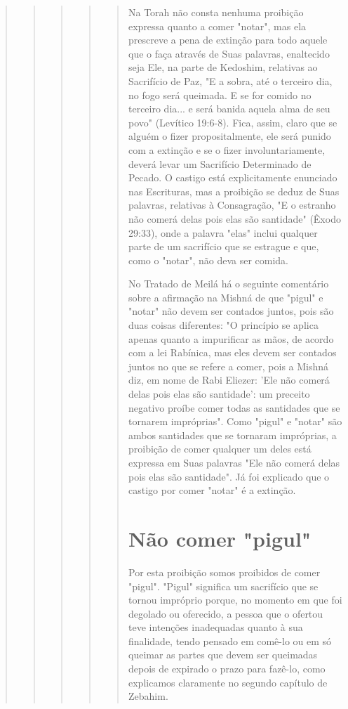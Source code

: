 \begin{quote}
\begin{quote}
\begin{quote}
\begin{quote}
\begin{quote}
Na Torah não consta nenhuma proibição expressa quanto a comer "notar",
mas ela prescreve a pena de extinção para todo aquele que o faça
atra­vés de Suas palavras, enaltecido seja Ele, na parte de Kedoshim,
relativas ao Sacrifício de Paz, "E a sobra, até o terceiro dia, no fogo
será queimada. E se for comido no terceiro dia... e será banida aquela
alma de seu povo" (Levítico 19:6-8). Fica, assim, claro que se alguém o
fizer propositalmente, ele será puni­do com a extinção e se o fizer
involuntariamente, deverá levar um Sacrifício Determinado de Pecado. O
castigo está explicitamente enunciado nas Escritu­ras, mas a proibição
se deduz de Suas palavras, relativas à Consagração, "E o estranho não
comerá delas pois elas são santidade" (Êxodo 29:33), onde a pala­vra
"elas" inclui qualquer parte de um sacrifício que se estrague e que,
como o "notar", não deva ser comida.

No Tratado de Meilá há o seguinte comentário sobre a afirmação na Mishná
de que "pigul" e "notar" não devem ser contados juntos, pois são duas
coisas diferentes: "O princípio se aplica apenas quanto a impurificar as
mãos, de acordo com a lei Rabínica, mas eles devem ser contados juntos
no que se refere a comer, pois a Mishná diz, em nome de Rabi Eliezer:
'Ele não comerá delas pois elas são santidade': um preceito negativo
proíbe comer todas as san­tidades que se tornarem impróprias". Como
"pigul" e "notar" são ambos san­tidades que se tornaram impróprias, a
proibição de comer qualquer um deles está expressa em Suas palavras "Ele
não comerá delas pois elas são santidade". Já foi explicado que o
castigo por comer "notar" é a extinção.

\section{Não comer "pigul"}

Por esta proibição somos proibidos de comer "pigul". "Pigul" sig­nifica
um sacrifício que se tornou impróprio porque, no momento em que foi
degolado ou oferecido, a pessoa que o ofertou teve intenções inadequadas
quan­to à sua finalidade, tendo pensado em comê-lo ou em só queimar as
partes que devem ser queimadas depois de expirado o prazo para fazê-lo,
como explica­mos claramente no segundo capítulo de Zebahim.


\end{quote}
\end{quote}
\end{quote}
\end{quote}
\end{quote}
